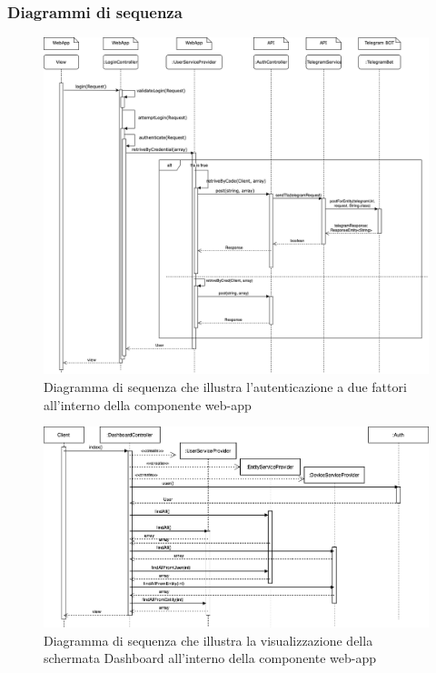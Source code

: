 	\begin{landscape}
	\subsubsection{Diagrammi di sequenza}
		\begin{figure}[H]
			\centering
			\includegraphics[scale=0.500]{res/images/WEBAPP/AutenticazioneTfa.png}
			\caption{Diagramma di sequenza che illustra l'autenticazione a due fattori all'interno della componente web-app}
		\end{figure}
		\begin{figure}[H]
			\centering
			\includegraphics[scale=0.600]{res/images/WEBAPP/Dashboard.index.png}
			\caption{Diagramma di sequenza che illustra la visualizzazione della schermata Dashboard all'interno della componente web-app}
		\end{figure}
	\end{landscape}
